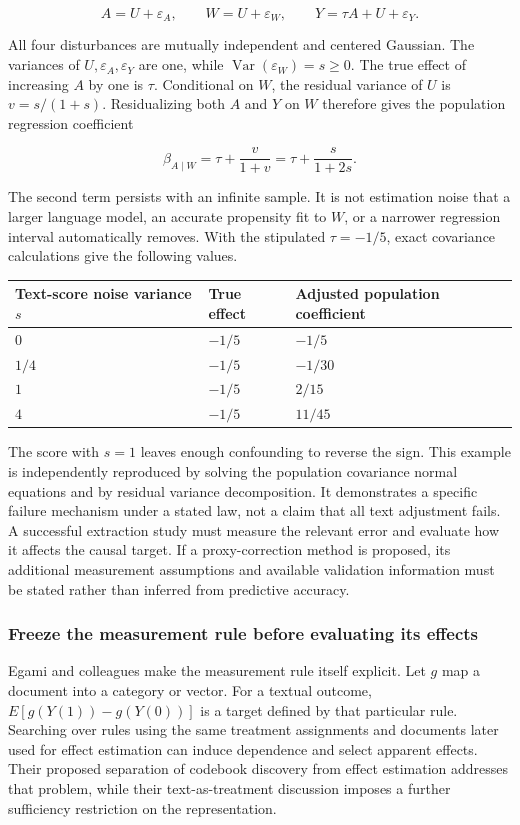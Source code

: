 \[
 A=U+\varepsilon_A,\qquad
 W=U+\varepsilon_W,\qquad
 Y=\tau A+U+\varepsilon_Y.
\]

All four disturbances are mutually independent and centered Gaussian.
The variances of \(U,\varepsilon_A,\varepsilon_Y\) are one, while
\(\operatorname{Var}(\varepsilon_W)=s\geq0\). The true effect of
increasing \(A\) by one is \(\tau\). Conditional on \(W\), the residual
variance of \(U\) is \(v=s/(1+s)\). Residualizing both \(A\) and \(Y\)
on \(W\) therefore gives the population regression coefficient

\[
 \beta_{A\mid W}
 =\tau+\frac{v}{1+v}
 =\tau+\frac{s}{1+2s}.
\]

The second term persists with an infinite sample. It is not estimation
noise that a larger language model, an accurate propensity fit to \(W\),
or a narrower regression interval automatically removes. With the
stipulated \(\tau=-1/5\), exact covariance calculations give the
following values.

\begin{longtable}[]{@{}lll@{}}
\toprule
Text-score noise variance \(s\) & True effect & Adjusted population
coefficient\tabularnewline
\midrule
\endhead
\(0\) & \(-1/5\) & \(-1/5\)\tabularnewline
\(1/4\) & \(-1/5\) & \(-1/30\)\tabularnewline
\(1\) & \(-1/5\) & \(2/15\)\tabularnewline
\(4\) & \(-1/5\) & \(11/45\)\tabularnewline
\bottomrule
\end{longtable}

The score with \(s=1\) leaves enough confounding to reverse the sign.
This example is independently reproduced by solving the population
covariance normal equations and by residual variance decomposition. It
demonstrates a specific failure mechanism under a stated law, not a
claim that all text adjustment fails. A successful extraction study must
measure the relevant error and evaluate how it affects the causal
target. If a proxy-correction method is proposed, its additional
measurement assumptions and available validation information must be
stated rather than inferred from predictive accuracy.

\hypertarget{freeze-the-measurement-rule-before-evaluating-its-effects}{%
\subsubsection{Freeze the measurement rule before evaluating its
effects}\label{freeze-the-measurement-rule-before-evaluating-its-effects}}

Egami and colleagues make the measurement rule itself explicit. Let
\(g\) map a document into a category or vector. For a textual outcome,
\(E[g(Y(1))-g(Y(0))]\) is a target defined by that particular rule.
Searching over rules using the same treatment assignments and documents
later used for effect estimation can induce dependence and select
apparent effects. Their proposed separation of codebook discovery from
effect estimation addresses that problem, while their text-as-treatment
discussion imposes a further sufficiency restriction on the
representation. \citep{exec13_census_texts}

